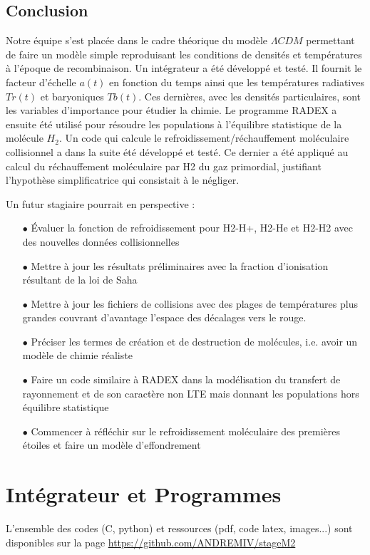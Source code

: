 \documentclass[10pt, a4paper]{report}
\numberwithin{equation}{subsection}
\begin{document}
\section*{Conclusion}
Notre équipe s'est placée dans le cadre théorique du modèle $\Lambda CDM$ permettant de faire un modèle simple reproduisant les conditions de densités et températures à l'époque de recombinaison. Un intégrateur a été développé et testé. Il fournit le facteur d'échelle $a(t)$ en fonction du temps ainsi que les températures radiatives $Tr(t)$ et baryoniques $Tb(t)$. Ces dernières, avec les densités particulaires, sont les variables d'importance pour étudier la chimie. Le programme RADEX a ensuite été utilisé pour résoudre les populations à l'équilibre statistique de la molécule $H_2$. Un code qui calcule le refroidissement/réchauffement moléculaire collisionnel a dans la suite été développé et testé. Ce dernier a été appliqué au calcul du réchauffement moléculaire par H2 du gaz primordial, justifiant l'hypothèse simplificatrice qui consistait à le négliger.

Un futur stagiaire pourrait en perspective :
\begin{itemize}
	\item [$\bullet$]\uppercase{é}valuer la fonction de refroidissement pour H2-H+, H2-He et H2-H2 avec des nouvelles données collisionnelles
	\item [$\bullet$] Mettre à jour les résultats préliminaires avec la fraction d'ionisation résultant de la loi de Saha
	\item [$\bullet$] Mettre à jour les fichiers de collisions avec des plages de températures plus grandes couvrant d'avantage l'espace des décalages vers le rouge.
	\item [$\bullet$] Préciser les termes de création et de destruction de molécules, i.e. avoir un modèle de chimie réaliste
	\item [$\bullet$] Faire un code similaire à RADEX dans la modélisation du transfert de rayonnement et de son caractère non LTE mais donnant les populations hors équilibre statistique
	\item [$\bullet$] Commencer à réfléchir sur le refroidissement moléculaire des premières étoiles et faire un modèle d'effondrement
\end{itemize}
\appendix

\chapter{Intégrateur et Programmes}
L'ensemble des codes (C, python) et ressources (pdf, code latex, images...) sont disponibles sur la page \url{https://github.com/ANDREMIV/stageM2}
\end{document}
